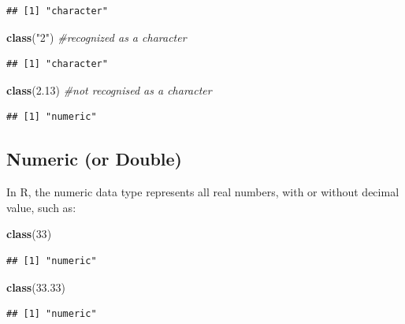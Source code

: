\documentclass[
]{book}
\newenvironment{Shaded}{\begin{snugshade}}{\end{snugshade}}
\newcommand{\CommentTok}[1]{\textcolor[rgb]{0.56,0.35,0.01}{\textit{#1}}}
\newcommand{\DecValTok}[1]{\textcolor[rgb]{0.00,0.00,0.81}{#1}}
\newcommand{\FloatTok}[1]{\textcolor[rgb]{0.00,0.00,0.81}{#1}}
\newcommand{\FunctionTok}[1]{\textcolor[rgb]{0.13,0.29,0.53}{\textbf{#1}}}
\newcommand{\NormalTok}[1]{#1}
\newcommand{\StringTok}[1]{\textcolor[rgb]{0.31,0.60,0.02}{#1}}
\begin{document}
\begin{verbatim}
## [1] "character"
\end{verbatim}

\begin{Shaded}
\begin{Highlighting}[]
\FunctionTok{class}\NormalTok{(}\StringTok{"2"}\NormalTok{) }\CommentTok{\#recognized as a character}
\end{Highlighting}
\end{Shaded}

\begin{verbatim}
## [1] "character"
\end{verbatim}

\begin{Shaded}
\begin{Highlighting}[]
\FunctionTok{class}\NormalTok{(}\FloatTok{2.13}\NormalTok{) }\CommentTok{\#not recognised as a character}
\end{Highlighting}
\end{Shaded}

\begin{verbatim}
## [1] "numeric"
\end{verbatim}

\hypertarget{numeric-or-double}{%
\subsection{Numeric (or Double)}\label{numeric-or-double}}

In R, the numeric data type represents all real numbers, with or without decimal value, such as:

\begin{Shaded}
\begin{Highlighting}[]
\FunctionTok{class}\NormalTok{(}\DecValTok{33}\NormalTok{)}
\end{Highlighting}
\end{Shaded}

\begin{verbatim}
## [1] "numeric"
\end{verbatim}

\begin{Shaded}
\begin{Highlighting}[]
\FunctionTok{class}\NormalTok{(}\FloatTok{33.33}\NormalTok{)}
\end{Highlighting}
\end{Shaded}

\begin{verbatim}
## [1] "numeric"
\end{verbatim}
\end{document}
